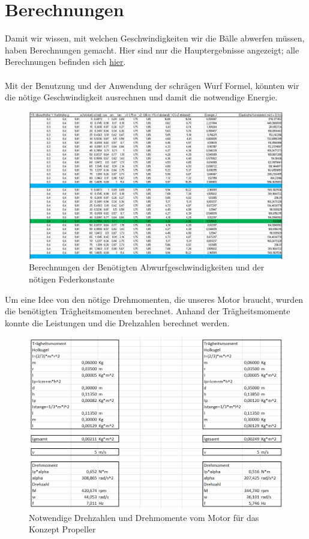 \section{Berechnungen}
Damit wir wissen, mit welchen Geschwindigkeiten wir die Bälle abwerfen müssen, haben Berechnungen gemacht.
Hier sind nur die Hauptergebnisse angezeigt; alle Berechnungen befinden sich \href{https://github.com/accefa/doku/tree/master/bin/Berechnungen.xlsx}{hier}. \\ \\
Mit der Benutzung und der Anwendung der schrägen Wurf Formel, könnten wir die nötige Geschwindigkeit ausrechnen und damit die notwendige Energie.
\begin{figure}[h!]
	\centering
	\includegraphics[width=1\textwidth]{../../fig/Geschwindigkeit_und_eleastische_Konstante.png}
	\caption{Berechnungen der Benötigten Abwurfgeschwindigkeiten und der nötigen Federkonstante}
	\label{fig:Berechnungen von die Geschwindigkeit}
\end{figure}
\newpage
Um eine Idee von den nötige Drehmomenten, die unseres Motor braucht, wurden die benötigten Trägheitsmomenten berechnet. Anhand der Trägheitsmomente konnte die Leistungen und die Drehzahlen berechnet werden.
\begin{figure}[h!]
	\centering
	\includegraphics[width=1\textwidth]{../../fig/Berechnungen_Propeller.png}
	\caption{Notwendige Drehzahlen und Drehmomente vom Motor für das Konzept Propeller}
	\label{fig:Berechnungen für der Propellerkonzept}
\end{figure}
